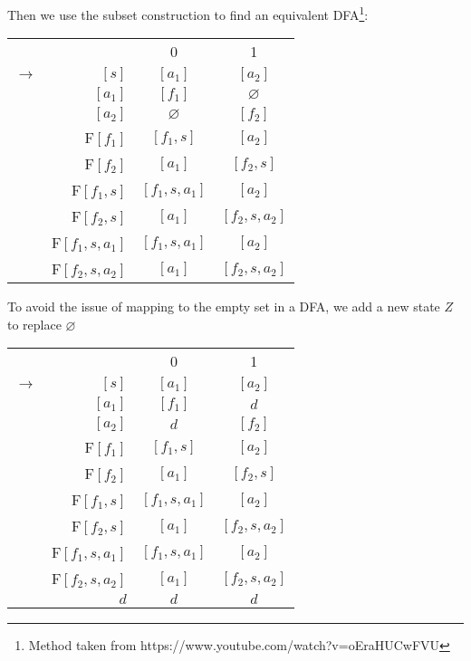 \documentclass{article}
\newcommand{\es}{\varnothing}
\theoremstyle{definition}
\begin{document}
\begin{enumerate}
\begin{enumerate}
	Then we use the subset construction to find an equivalent DFA\footnote{Method taken from https://www.youtube.com/watch?v=oEraHUCwFVU}:
	\begin{center}
		\begin{tabular}{cccc}
			& & 0 & 1 \\\cline{3-4}
			$\rightarrow$ & \multicolumn{1}{r|}{$[s]$} &$[a_1]$ & $[a_2]$ \\
			& \multicolumn{1}{r|}{$[a_1]$} & $[f_1]$ & $\es$\\
			& \multicolumn{1}{r|}{$[a_2]$} & $\es$ & $[f_2]$ \\
			& \multicolumn{1}{r|}{F$[f_1]$} & $[f_1,s]$ & $[a_2]$\\
			& \multicolumn{1}{r|}{F$[f_2]$} & $[a_1]$ & $[f_2,s]$\\
			& \multicolumn{1}{r|}{F$[f_1,s]$} & $[f_1,s,a_1]$ & $[a_2]$\\
			& \multicolumn{1}{r|}{F$[f_2,s]$} & $[a_1]$ & $[f_2,s,a_2]$\\
			& \multicolumn{1}{r|}{F$[f_1,s,a_1]$} & $[f_1,s,a_1]$ & $[a_2]$\\
			& \multicolumn{1}{r|}{F$[f_2,s,a_2]$} & $[a_1]$ & $[f_2,s,a_2]$\\
		\end{tabular}
	\end{center}
	
	To avoid the issue of mapping to the empty set in a DFA, we add a new state $Z$ to replace $\es$
		\begin{center}
		\begin{tabular}{cccc}
			& & 0 & 1 \\\cline{3-4}
			$\rightarrow$ & \multicolumn{1}{r|}{$[s]$} &$[a_1]$ & $[a_2]$ \\
			& \multicolumn{1}{r|}{$[a_1]$} & $[f_1]$ & $d$\\
			& \multicolumn{1}{r|}{$[a_2]$} & $d$ & $[f_2]$ \\
			& \multicolumn{1}{r|}{F$[f_1]$} & $[f_1,s]$ & $[a_2]$\\
			& \multicolumn{1}{r|}{F$[f_2]$} & $[a_1]$ & $[f_2,s]$\\
			& \multicolumn{1}{r|}{F$[f_1,s]$} & $[f_1,s,a_1]$ & $[a_2]$\\
			& \multicolumn{1}{r|}{F$[f_2,s]$} & $[a_1]$ & $[f_2,s,a_2]$\\
			& \multicolumn{1}{r|}{F$[f_1,s,a_1]$} & $[f_1,s,a_1]$ & $[a_2]$\\
			& \multicolumn{1}{r|}{F$[f_2,s,a_2]$} & $[a_1]$ & $[f_2,s,a_2]$\\
			& \multicolumn{1}{r|}{$d$} & $d$ & $d$\\
		\end{tabular}
	\end{center}


\end{enumerate}
\end{enumerate}
\end{document}
